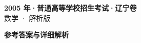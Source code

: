 \documentclass[zihao=-4, a4paper]{ctexart}
\begin{document}
\begin{center}
  {\Large\bfseries 2005 年·普通高等学校招生考试·辽宁卷}\\[4pt]
  {\large 数学 · 解析版}
\end{center}
\medskip
{}

\clearpage
{}
\begin{center}{\Large\bfseries 参考答案与详细解析}\end{center}
\medskip

\end{document}
